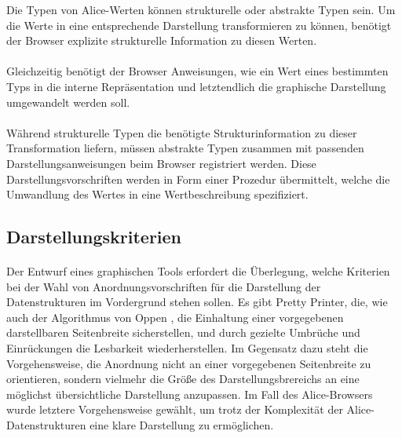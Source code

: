 \documentclass[12pt,a4paper]{article}
\begin{document}
Die Typen von Alice-Werten k\"onnen strukturelle oder abstrakte Typen 
sein. Um die Werte in eine entsprechende Darstellung transformieren 
zu k\"onnen, ben\"otigt der Browser explizite strukturelle  
Information zu diesen Werten. 

\paragraph{}

Gleichzeitig ben\"otigt der Browser Anweisungen, wie 
ein Wert eines bestimmten Typs in die interne 
Repr\"asentation und letztendlich die graphische Darstellung 
umgewandelt werden soll.

\paragraph{}

W\"ahrend strukturelle Typen die ben\"otigte Strukturinformation 
zu dieser Transformation liefern, m\"ussen abstrakte Typen 
zusammen mit passenden Darstellungsanweisungen beim Browser 
registriert werden. 
Diese Darstellungsvorschriften werden in Form einer 
Prozedur \"ubermittelt, welche die Umwandlung des Wertes in eine 
Wertbeschreibung spezifiziert.  

\subsection{Darstellungskriterien}

\paragraph{}

Der Entwurf eines graphischen Tools erfordert die \"Uberlegung, 
welche Kriterien bei der Wahl von Anordnungsvorschriften f\"ur 
die Darstellung der Datenstrukturen im Vordergrund stehen sollen. 
Es gibt Pretty Printer, die, wie auch der 
Algorithmus von Oppen \cite{op:pr}, die Einhaltung einer vorgegebenen 
darstellbaren Seitenbreite sicherstellen, und durch gezielte 
Umbr\"uche und Einr\"uckungen die Lesbarkeit wiederherstellen. Im 
Gegensatz dazu steht die Vorgehensweise, die Anordnung nicht 
an einer vorgegebenen Seitenbreite zu orientieren, sondern 
vielmehr die Gr\"o\ss e des Darstellungsbrereichs an eine m\"oglichst 
\"ubersichtliche Darstellung anzupassen. 
Im Fall des Alice-Browsers wurde letztere Vorgehensweise gew\"ahlt, 
um trotz der Komplexit\"at der Alice-Datenstrukturen 
eine klare Darstellung zu erm\"oglichen.
\end{document}
